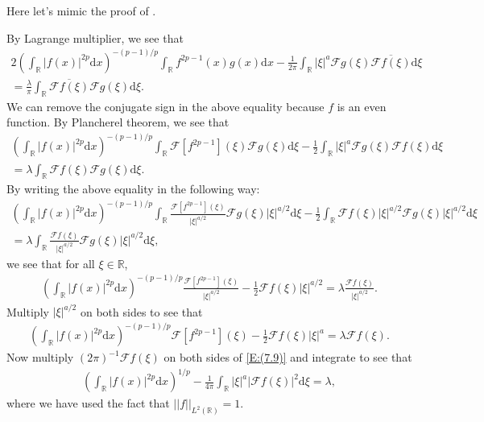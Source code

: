 \documentclass[a4paper,12pt]{article} %
\theoremstyle{plain}
\theoremstyle{definition}
\newcommand{\ud}{\ensuremath{\mathrm{d} }}
\newcommand{\Norm}[1]{\left|\left|  #1   \right|\right|}
\newcommand{\R}{\mathbb{R}}
\begin{document}

Here let's mimic the proof of \cite[Lemma 7.2]{ChenLi04}.
\bigskip

By Lagrange multiplier, we see that
\begin{multline*}
	2\left(\int_\R |f(x)|^{2p}\ud x\right)^{-(p-1)/p} \int_\R f^{2p-1}(x)g(x)\ud x
	- \frac{1}{2\pi} \int_{\R} |\xi|^a \mathcal{F} g(\xi) \overline{\mathcal{F} f(\xi)} \ud \xi \\
	= \frac{\lambda}{\pi}\int_\R \overline{\mathcal{F}f(\xi)} \mathcal{F}g(\xi) \ud \xi.
\end{multline*}
We can remove the conjugate sign in the above equality because $f$ is an even function.
By Plancherel theorem, we see that
\begin{multline*}
	\left(\int_\R |f(x)|^{2p}\ud x\right)^{-(p-1)/p} \int_\R \mathcal{F}[f^{2p-1}](\xi)
	\mathcal{F}g(\xi)\ud \xi -
	\frac{1}{2}\int_{\R} |\xi|^a \mathcal{F} g(\xi) \mathcal{F} f(\xi) \ud \xi \\
	= \lambda\int_\R \mathcal{F}f(\xi) \mathcal{F}g(\xi) \ud \xi.
\end{multline*}
By writing the above equality in the following way:
\begin{multline*}
	\left(\int_\R |f(x)|^{2p}\ud x\right)^{-(p-1)/p} \int_\R
	\frac{\mathcal{F}[f^{2p-1}](\xi)}{|\xi|^{a/2}}
	\mathcal{F}g(\xi)|\xi|^{a/2}\ud \xi -
	\frac{1}{2}\int_{\R} \mathcal{F} f(\xi) |\xi|^{a/2} \mathcal{F} g(\xi) |\xi|^{a/2} \ud \xi \\
	= \lambda\int_\R \frac{\mathcal{F}f(\xi)}{|\xi|^{a/2}} \mathcal{F}g(\xi) |\xi|^{a/2} \ud \xi,
\end{multline*}
we see that for all $\xi\in\R$,
\begin{align*}
	\left(\int_\R |f(x)|^{2p}\ud x\right)^{-(p-1)/p} \frac{\mathcal{F}[f^{2p-1}](\xi)}{|\xi|^{a/2}}
	- \frac{1}{2}\mathcal{F} f(\xi) |\xi|^{a/2}
	= \lambda \frac{\mathcal{F}f(\xi)}{|\xi|^{a/2}}.
\end{align*}
Multiply $|\xi|^{a/2}$ on both sides to see that
\begin{align}
	\label{E:(7.9)} \tag{7.9}
	\left(\int_\R |f(x)|^{2p}\ud x\right)^{-(p-1)/p} \mathcal{F}[f^{2p-1}](\xi)
	- \frac{1}{2}\mathcal{F} f(\xi) |\xi|^{a}
	= \lambda \mathcal{F}f(\xi).
\end{align}
Now multiply $(2\pi)^{-1}\mathcal{F}f(\xi)$ on both sides of \eqref{E:(7.9)} and integrate to see that
\begin{align*}
	\left(\int_\R |f(x)|^{2p}\ud x\right)^{1/p}
	-\frac{1}{4\pi}\int_\R |\xi|^a |\mathcal{F}f(\xi)|^2\ud \xi
	= \lambda,
\end{align*}
where we have used the fact that $\Norm{f}_{L^2(\R)}=1$.
\end{document}
